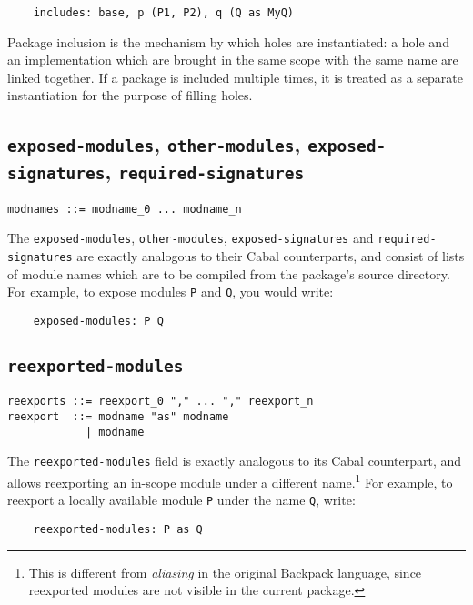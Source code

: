 \documentclass{article}
\begin{document}
\begin{verbatim}
    includes: base, p (P1, P2), q (Q as MyQ)
\end{verbatim}

Package inclusion is the mechanism by which holes are instantiated:
a hole and an implementation which are brought in the same scope with
the same name are linked together.  If a package is included multiple
times, it is treated as a separate instantiation for the purpose of
filling holes.

\subsection{\texttt{exposed-modules}, \texttt{other-modules}, \texttt{exposed-signatures}, \texttt{required-signatures}}

\begin{verbatim}
modnames ::= modname_0 ... modname_n
\end{verbatim}

The \texttt{exposed-modules}, \texttt{other-modules},
\texttt{exposed-signatures} and \texttt{required-signatures} are exactly
analogous to their Cabal counterparts, and consist of lists of module names
which are to be compiled from the package's source directory.  For example,
to expose modules \texttt{P} and \texttt{Q}, you would write:

\begin{verbatim}
    exposed-modules: P Q
\end{verbatim}

\subsection{\texttt{reexported-modules}}

\begin{verbatim}
reexports ::= reexport_0 "," ... "," reexport_n
reexport  ::= modname "as" modname
            | modname
\end{verbatim}

The \texttt{reexported-modules} field is exactly analogous to its Cabal
counterpart, and allows reexporting an in-scope module under a different name.\footnote{This is different from \emph{aliasing} in the original Backpack language, since reexported modules are not visible in the current package.}  For example, to reexport a locally available module \texttt{P} under the name \texttt{Q}, write:

\begin{verbatim}
    reexported-modules: P as Q
\end{verbatim}
\end{document}
